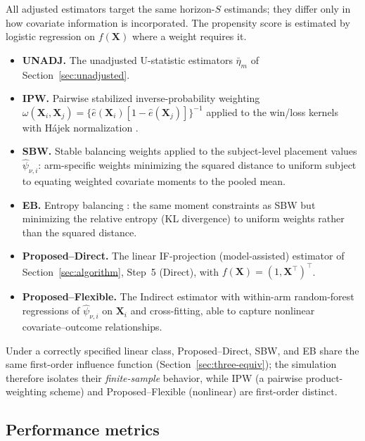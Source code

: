 \documentclass[11pt,a4paper]{article}
\begin{document}
All adjusted estimators target the same horizon-$S$ estimands; they differ only in how
covariate information is incorporated. The propensity score is estimated by logistic
regression on $f(\mathbf X)$ where a weight requires it.
\begin{itemize}
\item \textbf{UNADJ.} The unadjusted U-statistic estimators $\bar\eta_m$ of
   Section~\ref{sec:unadjusted}.
\item \textbf{IPW.} Pairwise stabilized inverse-probability weighting
   $\omega(\mathbf X_i,\mathbf X_j)=\{\hat e(\mathbf X_i)[1-\hat e(\mathbf X_j)]\}^{-1}$
   applied to the win/loss kernels with H\'ajek normalization \citep{cao2025covariate}.
\item \textbf{SBW.} Stable balancing weights \citep{zubizarreta2015stable} applied to the
   subject-level placement values $\hat\psi_{\nu,i}$: arm-specific weights minimizing the
   squared distance to uniform subject to equating weighted covariate moments to the
   pooled mean.
\item \textbf{EB.} Entropy balancing \citep{hainmueller2012entropy}: the same moment
   constraints as SBW but minimizing the relative entropy (KL divergence) to uniform
   weights rather than the squared distance.
\item \textbf{Proposed--Direct.} The linear IF-projection (model-assisted) estimator of
   Section~\ref{sec:algorithm}, Step~5 (Direct), with $f(\mathbf X)=(1,\mathbf X^\top)^\top$.
\item \textbf{Proposed--Flexible.} The Indirect estimator with within-arm random-forest
   regressions of $\hat\psi_{\nu,i}$ on $\mathbf X_i$ and cross-fitting, able to capture
   nonlinear covariate--outcome relationships.
\end{itemize}
Under a correctly specified linear class, Proposed--Direct, SBW, and EB share the same
first-order influence function (Section~\ref{sec:three-equiv}); the simulation therefore
isolates their \emph{finite-sample} behavior, while IPW (a pairwise product-weighting
scheme) and Proposed--Flexible (nonlinear) are first-order distinct.

\subsection{Performance metrics}\label{sec:sim_metrics}
\end{document}
